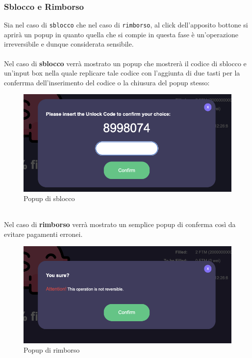             \subsubsection{Sblocco e Rimborso}
       Sia nel caso di \texttt{sblocco} che nel caso di \texttt{rimborso}, al click dell'apposito bottone si aprirà un popup in quanto quella che si compie in questa fase è un'operazione irreversibile e dunque considerata sensibile.\\\\
        Nel caso di \textbf{sblocco} verrà mostrato un popup che mostrerà il codice di sblocco e un'input box nella quale replicare tale codice con l'aggiunta di due tasti per la conferrma dell'inserimento del codice o la chiusura del popup stesso:
        \begin{figure}[H]
            \centering
            \includegraphics[scale=0.3]{immagini/Checkout/UnlockPopUp.png} 
            \caption{Popup di sblocco}
        \end{figure}
        \textbf{}\\
        Nel caso di \textbf{rimborso} verrà mostrato un semplice popup di conferma così da evitare pagamenti erronei.
        \begin{figure}[H]
            \centering
            \includegraphics[scale=0.3]{immagini/Checkout/RefundPopUp.png} 
            \caption{Popup di rimborso}
        \end{figure}
